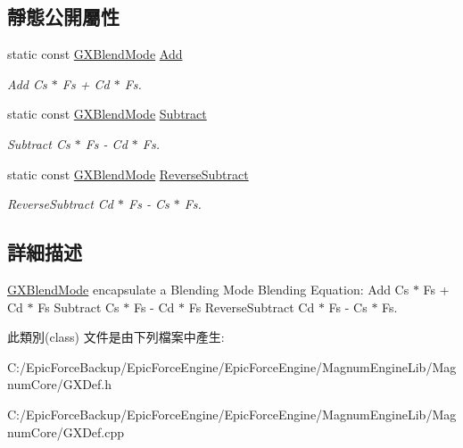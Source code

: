 \subsection*{靜態公開屬性}
\begin{DoxyCompactItemize}
\item 
static const \hyperlink{class_magnum_1_1_g_x_blend_mode}{G\+X\+Blend\+Mode} \hyperlink{class_magnum_1_1_g_x_blend_mode_a24459b1f0fc851c269566cda525992ae}{Add}\hypertarget{class_magnum_1_1_g_x_blend_mode_a24459b1f0fc851c269566cda525992ae}{}\label{class_magnum_1_1_g_x_blend_mode_a24459b1f0fc851c269566cda525992ae}

\begin{DoxyCompactList}\small\item\em Add Cs $\ast$ Fs + Cd $\ast$ Fs. \end{DoxyCompactList}\item 
static const \hyperlink{class_magnum_1_1_g_x_blend_mode}{G\+X\+Blend\+Mode} \hyperlink{class_magnum_1_1_g_x_blend_mode_a723036c84417aaff0c0e3fb5cf10ebcd}{Subtract}\hypertarget{class_magnum_1_1_g_x_blend_mode_a723036c84417aaff0c0e3fb5cf10ebcd}{}\label{class_magnum_1_1_g_x_blend_mode_a723036c84417aaff0c0e3fb5cf10ebcd}

\begin{DoxyCompactList}\small\item\em Subtract Cs $\ast$ Fs -\/ Cd $\ast$ Fs. \end{DoxyCompactList}\item 
static const \hyperlink{class_magnum_1_1_g_x_blend_mode}{G\+X\+Blend\+Mode} \hyperlink{class_magnum_1_1_g_x_blend_mode_a34d0bd2fd10180d6ac53c14f37dd40ab}{Reverse\+Subtract}\hypertarget{class_magnum_1_1_g_x_blend_mode_a34d0bd2fd10180d6ac53c14f37dd40ab}{}\label{class_magnum_1_1_g_x_blend_mode_a34d0bd2fd10180d6ac53c14f37dd40ab}

\begin{DoxyCompactList}\small\item\em Reverse\+Subtract Cd $\ast$ Fs -\/ Cs $\ast$ Fs. \end{DoxyCompactList}\end{DoxyCompactItemize}


\subsection{詳細描述}
\hyperlink{class_magnum_1_1_g_x_blend_mode}{G\+X\+Blend\+Mode} encapsulate a Blending Mode Blending Equation\+: Add Cs $\ast$ Fs + Cd $\ast$ Fs Subtract Cs $\ast$ Fs -\/ Cd $\ast$ Fs Reverse\+Subtract Cd $\ast$ Fs -\/ Cs $\ast$ Fs. 

此類別(class) 文件是由下列檔案中產生\+:\begin{DoxyCompactItemize}
\item 
C\+:/\+Epic\+Force\+Backup/\+Epic\+Force\+Engine/\+Epic\+Force\+Engine/\+Magnum\+Engine\+Lib/\+Magnum\+Core/G\+X\+Def.\+h\item 
C\+:/\+Epic\+Force\+Backup/\+Epic\+Force\+Engine/\+Epic\+Force\+Engine/\+Magnum\+Engine\+Lib/\+Magnum\+Core/G\+X\+Def.\+cpp\end{DoxyCompactItemize}
